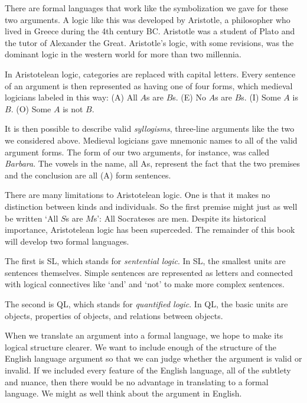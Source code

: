 There are formal languages that work like the symbolization we gave for these two arguments. A logic like this was developed by Aristotle, a philosopher who lived in Greece during the 4th century BC. Aristotle was a student of Plato and the tutor of Alexander the Great. Aristotle's logic, with some revisions, was the dominant logic in the western world for more than two millennia.

In Aristotelean logic, categories are replaced with capital letters. Every sentence of an argument is then represented as having one of four forms, which medieval logicians labeled in this way: (A) All $A$s are $B$s. (E) No $A$s are $B$s. (I) Some $A$ is $B$. (O) Some $A$ is not $B$.

It is then possible to describe valid \emph{syllogisms}, three-line arguments like the two we considered above. Medieval logicians gave mnemonic names to all of the valid argument forms. The form of our two arguments, for instance, was called \emph{Barbara}. The vowels in the name, all As, represent the fact that the two premises and the conclusion are all (A) form sentences.

There are many limitations to Aristotelean logic. One is that it makes no distinction between kinds and individuals. So the first premise might just as well be written `All $S$s are $M$s': All Socrateses are men. Despite its historical importance, Aristotelean logic has been superceded. The remainder of this book will develop two formal languages.

The first is SL, which stands for \emph{sentential logic}. In SL, the smallest units are sentences themselves. Simple sentences are represented as letters and connected with {logical connectives} like `and' and `not' to make more complex sentences.

The second is QL, which stands for \emph{quantified logic}. In QL, the basic units are objects, properties of objects, and relations between objects.




When we translate an argument into a formal language, we hope to make its logical structure clearer. We want to include enough of the structure of the English language argument so that we can judge whether the argument is valid or invalid. If we included every feature of the English language, all of the subtlety and nuance, then there would be no advantage in translating to a formal language. We might as well think about the argument in English.

